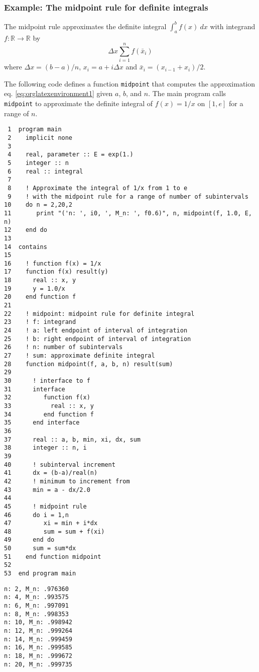 \documentclass[11pt]{article}
\begin{document}
\subsubsection{Example: The midpoint rule for definite integrals}
\label{sec:orgheadline46}
The midpoint rule approximates the definite integral \(\int_a^bf(x)~dx\) with integrand \(f:\mathbb{R}\rightarrow\mathbb{R}\) by
\begin{equation}
\label{eq:orglatexenvironment1}
\Delta x\sum_{i=1}^nf(\bar{x}_i)
\end{equation}
where \(\Delta x=(b-a)/n\), \(x_i=a+i\Delta x\) and \(\bar{x}_i=(x_{i-1}+x_i)/2\).

The following code defines a function \texttt{midpoint} that computes the approximation eq. \ref{eq:orglatexenvironment1} given \(a\), \(b\), and \(n\). The main program calls \texttt{midpoint} to approximate the definite integral of \(f(x)=1/x\) on \([1,e]\) for a range of \(n\).

\begin{verbatim}
 1  program main
 2    implicit none
 3  
 4    real, parameter :: E = exp(1.)
 5    integer :: n
 6    real :: integral
 7  
 8    ! Approximate the integral of 1/x from 1 to e
 9    ! with the midpoint rule for a range of number of subintervals
10    do n = 2,20,2
11       print "('n: ', i0, ', M_n: ', f0.6)", n, midpoint(f, 1.0, E, n)
12    end do
13  
14  contains
15  
16    ! function f(x) = 1/x
17    function f(x) result(y)
18      real :: x, y
19      y = 1.0/x
20    end function f
21  
22    ! midpoint: midpoint rule for definite integral
23    ! f: integrand
24    ! a: left endpoint of interval of integration
25    ! b: right endpoint of interval of integration
26    ! n: number of subintervals
27    ! sum: approximate definite integral
28    function midpoint(f, a, b, n) result(sum)
29  
30      ! interface to f
31      interface
32         function f(x)
33           real :: x, y
34         end function f
35      end interface
36  
37      real :: a, b, min, xi, dx, sum
38      integer :: n, i
39  
40      ! subinterval increment
41      dx = (b-a)/real(n)
42      ! minimum to increment from
43      min = a - dx/2.0
44  
45      ! midpoint rule
46      do i = 1,n
47         xi = min + i*dx
48         sum = sum + f(xi)
49      end do
50      sum = sum*dx
51    end function midpoint
52  
53  end program main
\end{verbatim}

\begin{verbatim}
n: 2, M_n: .976360
n: 4, M_n: .993575
n: 6, M_n: .997091
n: 8, M_n: .998353
n: 10, M_n: .998942
n: 12, M_n: .999264
n: 14, M_n: .999459
n: 16, M_n: .999585
n: 18, M_n: .999672
n: 20, M_n: .999735
\end{verbatim}
\end{document}
